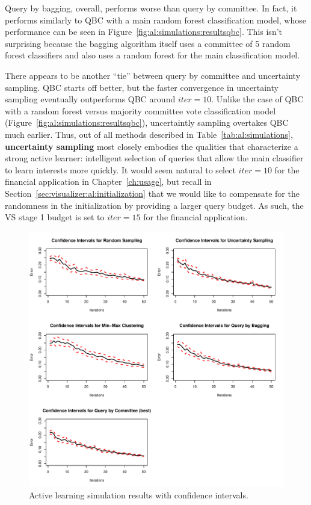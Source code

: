 Query by bagging, overall, performs worse than query by committee. In fact, it 
performs similarly to QBC with a main random forest classification model, whose 
performance can be seen in Figure~\ref{fig:al:simulations:resultsqbc}. 
This isn't surprising because the bagging algorithm itself uses a committee of 
5 random forest classifiers and also uses a random forest for the main 
classification model. 

There appears to be another ``tie'' between query by committee and uncertainty 
sampling. QBC starts off better, but the faster convergence in uncertainty 
sampling eventually outperforms QBC around $iter = 10$. Unlike the case of QBC 
with a random forest versus majority committee vote classification model 
(Figure~\ref{fig:al:simulations:resultsqbc}), uncertaintly sampling overtakes 
QBC much earlier. Thus, out of all methods described in 
Table~\ref{tab:al:simulations}, \textbf{uncertainty sampling} most closely 
embodies the qualities that characterize a strong active learner: intelligent 
selection of queries that allow the main classifier to learn interests more 
quickly. It would seem natural to select $iter = 10$ for the financial 
application in Chapter~\ref{ch:usage}, but recall in 
Section~\ref{sec:visualizer:al:initialization} that we would like to compensate 
for the randomness in the initialization by providing a larger query budget. As 
such, the VS stage 1 budget is set to $iter = 15$ for the financial application.

\begin{figure}[htb]
	\begin{center}
		\includegraphics[width=1\linewidth]{ch-al/figures/results_ci.pdf}
		\caption[Active learning simulation results with confidence 
		intervals.]{Active learning simulation results with confidence 
		intervals.}
		\label{fig:al:simulations:resultsci}
	\end{center}
\end{figure}

